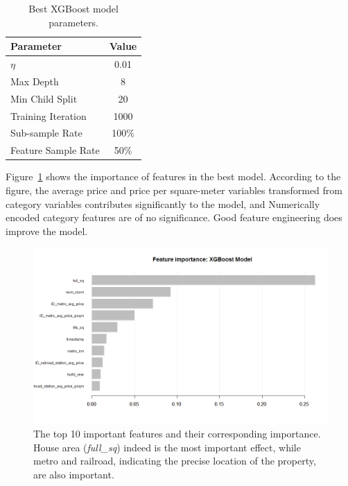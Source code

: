 \documentclass{article}
\begin{document}
\begin{table}[t]
\caption{Best XGBoost model parameters. }
\label{tab2}
\vskip 0.15in
\begin{center}
\begin{small}
\begin{sc}
\begin{tabular}{lc}
\toprule
Parameter & Value \\
\midrule
$\eta$ & 0.01 \\
Max Depth & 8 \\
Min Child Split & 20 \\
Training Iteration & 1000 \\
Sub-sample Rate & 100\% \\
Feature Sample Rate & 50\% \\
\bottomrule
\end{tabular}
\end{sc}
\end{small}
\end{center}
\vskip -0.1in
\end{table}

Figure~\ref{fig3} shows the importance of features in the best model. According to the figure, the average price and price per square-meter variables transformed from category variables contributes significantly to the model, and Numerically encoded category features are of no significance. Good feature engineering does improve the model.

\begin{figure}[ht]
\vskip 0.2in
\begin{center}
\centerline{\includegraphics[width=\columnwidth]{importance}}
\caption{The top 10 important features and their corresponding importance. House area (\textit{full\_sq}) indeed is the most important effect, while metro and railroad, indicating the precise location of the property, are also important. }
\label{fig3}
\end{center}
\vskip -0.2in
\end{figure}
\end{document}
